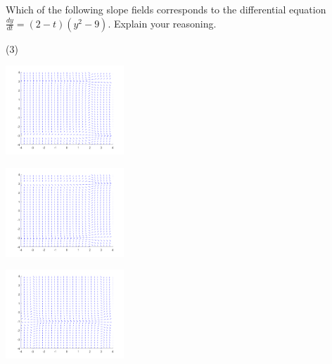\begin{exercise}
Which of the following slope fields corresponds to the differential equation $\frac{dy}{dt} = (2-t)(y^2 - 9)$. Explain your reasoning.
\begin{tasks}(3)
\task
\parbox[c]{1.75in}{\includegraphics[width=1.75in]{Images/yprimetm2ysqm9slope}}
\task
\parbox[c]{1.75in}{\includegraphics[width=1.75in]{Images/yprime2mtysqm9slope}}
\task
\parbox[c]{1.75in}{\includegraphics[width=1.75in]{Images/yprimeyp1tsqm9slope}}
\end{tasks}
\end{exercise}

\newpage

